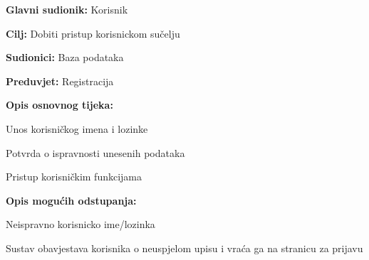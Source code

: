 					\noindent {}
					\begin{packed_item}

						\item \textbf{Glavni sudionik:} Korisnik
						\item  \textbf{Cilj:} Dobiti pristup korisnickom sučelju
						\item  \textbf{Sudionici:} Baza podataka
						\item  \textbf{Preduvjet:} Registracija
						\item  \textbf{Opis osnovnog tijeka:}

						\item[] \begin{packed_enum}

							\item Unos korisničkog imena i lozinke
							\item Potvrda o ispravnosti unesenih podataka
							\item Pristup korisničkim funkcijama

						\end{packed_enum}

						\item  \textbf{Opis mogućih odstupanja:}

						\item[] \begin{packed_item}

							\item[2.a] Neispravno korisnicko ime/lozinka 
							\item[] \begin{packed_enum}

								\item Sustav obavjestava korisnika o neuspjelom upisu i vraća ga na stranicu za prijavu

							\end{packed_enum}

						\end{packed_item}
					\end{packed_item}


